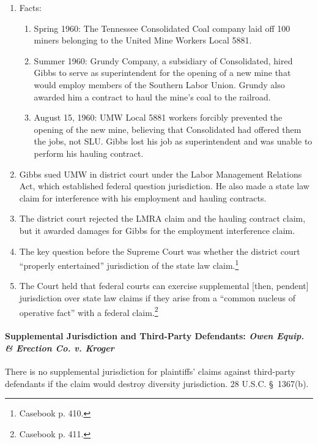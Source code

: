 \begin{enumerate}
    \item Facts:
    \begin{enumerate}
        \item Spring 1960: The Tennessee Consolidated Coal company laid off 
        100 miners belonging to the United Mine Workers Local 5881.
        \item Summer 1960: Grundy Company, a subsidiary of Consolidated, hired 
        Gibbs to serve as superintendent for the opening of a new mine that 
        would employ members of the Southern Labor Union. Grundy also awarded 
        him a contract to haul the mine's coal to the railroad.
        \item August 15, 1960: UMW Local 5881 workers forcibly prevented the 
        opening of the new mine, believing that Consolidated had offered them 
        the jobs, not SLU. Gibbs lost his job as superintendent and was unable 
        to perform his hauling contract.
    \end{enumerate}
    \item Gibbs sued UMW in district court under the Labor Management 
    Relations Act, which established federal question jurisdiction. He also 
    made a state law claim for interference with his employment and hauling 
    contracts.
    \item The district court rejected the LMRA claim and the hauling contract 
    claim, but it awarded damages for Gibbs for the employment interference 
    claim.
    \item The key question before the Supreme Court was whether the district 
    court ``properly entertained'' jurisdiction of the state law 
    claim.\footnote{Casebook p. 410.}
    \item The Court held that federal courts can exercise supplemental [then, 
    pendent] jurisdiction over state law claims if they arise from a ``common 
    nucleus of operative fact'' with a federal claim.\footnote{Casebook p.  
    411.}
\end{enumerate}

\paragraph{Supplemental Jurisdiction and Third-Party Defendants: \emph{Owen 
Equip. \& Erection Co. v. Kroger}}

There is no supplemental jurisdiction for plaintiffs' claims against 
third-party defendants if the claim would destroy diversity jurisdiction. 28 
U.S.C. \S\ 1367(b).

